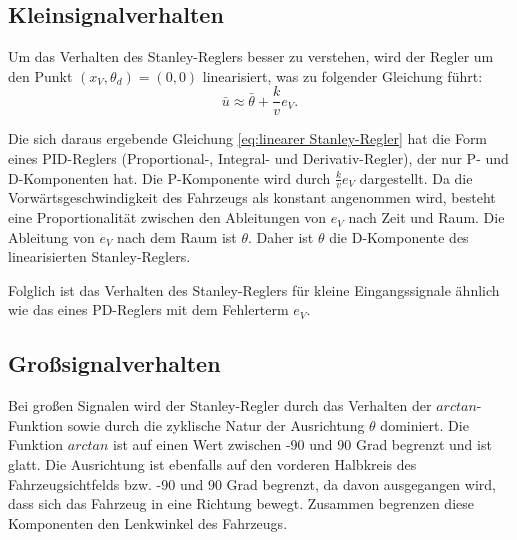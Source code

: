 \documentclass[arbeit=studie,oneside,BCOR=12mm]{ArbeitRST}
\begin{document}
\subsection{Kleinsignalverhalten}


Um das Verhalten des Stanley-Reglers besser zu verstehen, wird der Regler um
den Punkt $\left(x_V, \theta_d\right) = \left(0, 0\right)$
linearisiert, was zu folgender Gleichung führt: 
\begin{equation} \bar{u} \approx \bar{\theta} + \frac{k}{v}e_{V}. 
    \label{eq:linearer Stanley-Regler}
\end{equation}

Die sich daraus ergebende Gleichung \eqref{eq:linearer Stanley-Regler} hat die
Form eines PID-Reglers (Proportional-, Integral- und Derivativ-Regler), der nur
P- und D-Komponenten hat. Die P-Komponente wird durch \(\frac{k}{v}e_{V}\)
dargestellt. Da die Vorwärtsgeschwindigkeit des Fahrzeugs als konstant
angenommen wird, besteht eine Proportionalität zwischen den Ableitungen von
\(e_{V}\) nach Zeit und Raum. Die Ableitung von \(e_{V}\) nach dem Raum ist
\(\theta\). Daher ist \(\theta\) die D-Komponente des linearisierten
Stanley-Reglers.

Folglich ist das Verhalten des Stanley-Reglers für kleine Eingangssignale
ähnlich wie das eines PD-Reglers mit dem Fehlerterm \(e_{V}\). 


\subsection{Gro{\ss}signalverhalten}

Bei großen Signalen wird der Stanley-Regler durch das Verhalten der
\(arctan\)-Funktion sowie durch die zyklische Natur der Ausrichtung
\(\theta\) dominiert. Die Funktion \(arctan\) ist auf einen Wert zwischen
-90 und 90 Grad begrenzt und ist glatt. Die Ausrichtung ist ebenfalls auf den
vorderen Halbkreis des Fahrzeugsichtfelds bzw. -90 und 90 Grad begrenzt, da davon ausgegangen wird,
dass sich das Fahrzeug in eine Richtung bewegt. Zusammen begrenzen diese
Komponenten den Lenkwinkel des Fahrzeugs.


\end{document}
